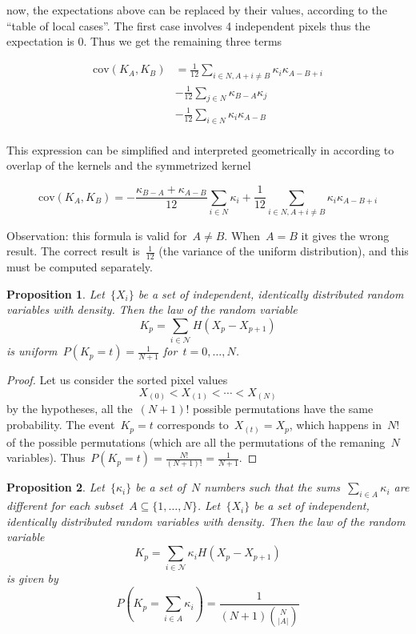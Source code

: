 \documentclass[12pt]{article}                  %
\newtheorem{proposition}{Proposition}
\begin{document}
now, the expectations above can be replaced by their values, according to
the ``table of local cases''.  The first case involves 4 independent pixels
thus the expectation is 0.  Thus we get the remaining three terms

\begin{align*}
	\mathrm{cov}(K_A,K_B)
	&=
	\frac1{12}
	\sum_{i\in N,A+i\neq B}
	\kappa_i\kappa_{A-B+i}
	\\
	&-\frac1{12}
	\sum_{j\in N}
	\kappa_{B-A}\kappa_j
	\\
	&-\frac1{12}
	\sum_{i\in N}
	\kappa_i\kappa_{A-B}
	\\
\end{align*}

This expression can be simplified and interpreted geometrically in according
to overlap of the kernels and the symmetrized kernel


\[
	\mathrm{cov}(K_A,K_B)
	=
	-
	\frac{\kappa_{B-A}+\kappa_{A-B}}{12}
	\sum_{i\in N} \kappa_i
	+
	\frac1{12}
	\sum_{i\in N,A+i\neq B} \kappa_i\kappa_{A-B+i}
\]

Observation: this formula is valid for~$A\neq B$.  When~$A=B$ it gives the
wrong result.  The correct result is~$\frac1{12}$ (the variance of the
uniform distribution), and this must be computed separately.

\clearpage

\begin{proposition}
	Let~$\{X_i\}$ be a set of independent, identically distributed random
	variables with density.
	Then the law of the random variable
	\[
		K_p = \sum_{i\in\mathcal N}H(X_p-X_{p+1})
	\]
	is uniform~$P(K_p=t)=\frac1{N+1}$ for~$t=0,\ldots,N$.
\end{proposition}

\begin{proof}
	Let us consider the sorted pixel values
	\[
		X_{(0)} < X_{(1)} < \cdots < X_{(N)}
	\]
	by the hypotheses, all the~$(N+1)!$ possible permutations  have the same
	probability.
	The event~$K_p=t$ corresponds to~$X_{(t)}=X_p$, which happens in~$N!$ of
	the possible permutations (which are all the permutations of the
	remaning~$N$ variables).  Thus~$P(K_p=t)=\frac{N!}{(N+1)!}=\frac1{N+1}$.
\end{proof}


\begin{proposition}
	Let~$\{\kappa_i\}$ be a set of~$N$ numbers such that the sums~$\sum_{i\in
	A}\kappa_i$ are different for each subset~$A\subseteq\{1,\ldots,N\}$.
	Let~$\{X_i\}$ be a set of independent, identically distributed random
	variables with density.
	Then the law of the random variable
	\[
		K_p = \sum_{i\in\mathcal N}\kappa_i H(X_p-X_{p+1})
	\]
	is given by
	\[
		P\left(K_p=\sum_{i\in A}\kappa_i\right)
		=
		\frac1{(N+1){N\choose |A|}}
	\]
\end{proposition}
\end{document}
